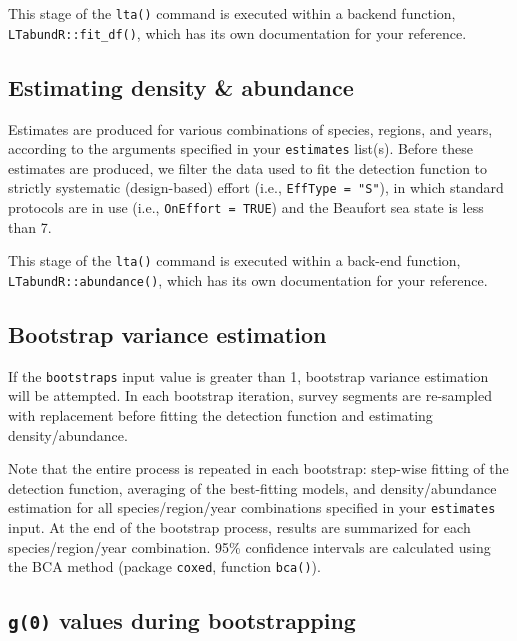 \documentclass[
]{book}
\begin{document}
This stage of the \texttt{lta()} command is executed within a backend function, \texttt{LTabundR::fit\_df()}, which has its own documentation for your reference.

\hypertarget{estimating-density-abundance}{%
\subsection*{Estimating density \& abundance}\label{estimating-density-abundance}}

Estimates are produced for various combinations of species, regions, and years, according to the arguments specified in your \texttt{estimates} list(s). Before these estimates are produced, we filter the data used to fit the detection function to strictly systematic (design-based) effort (i.e., \texttt{EffType\ =\ "S"}), in which standard protocols are in use (i.e., \texttt{OnEffort\ =\ TRUE}) and the Beaufort sea state is less than 7.

This stage of the \texttt{lta()} command is executed within a back-end function, \texttt{LTabundR::abundance()}, which has its own documentation for your reference.

\hypertarget{bootstrap-variance-estimation}{%
\subsection*{Bootstrap variance estimation}\label{bootstrap-variance-estimation}}

If the \texttt{bootstraps} input value is greater than 1, bootstrap variance estimation will be attempted. In each bootstrap iteration, survey segments are re-sampled with replacement before fitting the detection function and estimating density/abundance.

Note that the entire process is repeated in each bootstrap: step-wise fitting of the detection function, averaging of the best-fitting models, and density/abundance estimation for all species/region/year combinations specified in your \texttt{estimates} input. At the end of the bootstrap process, results are summarized for each species/region/year combination. 95\% confidence intervals are calculated using the BCA method (package \texttt{coxed}, function \texttt{bca()}).

\hypertarget{g0-values-during-bootstrapping}{%
\subsection*{\texorpdfstring{\texttt{g(0)} values during bootstrapping}{g(0) values during bootstrapping}}\label{g0-values-during-bootstrapping}}
\end{document}
